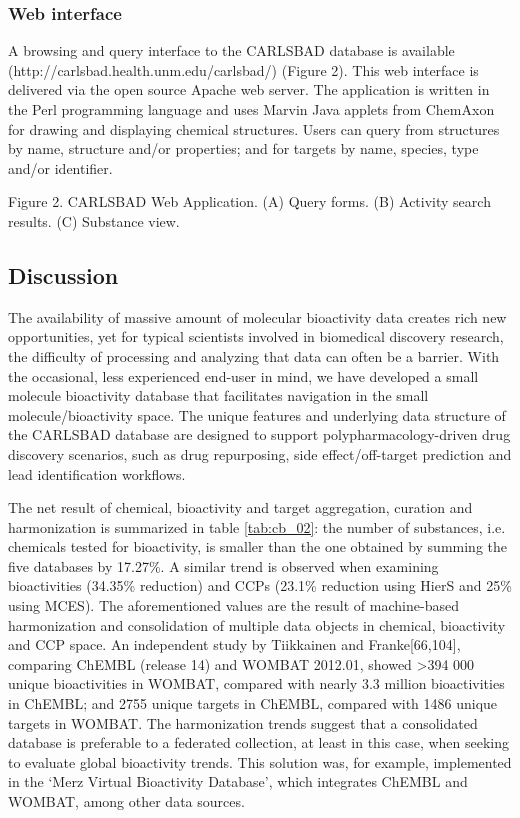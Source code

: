 \subsubsection{Web interface}

A browsing and query interface to the CARLSBAD database is available (http://carlsbad.health.unm.edu/carlsbad/) (Figure 2). This web interface is delivered via the open source Apache web server. The application is written in the Perl programming language and uses Marvin Java applets from ChemAxon for drawing and displaying chemical structures. Users can query from structures by name, structure and/or properties; and for targets by name, species, type and/or identifier.

Figure 2.
CARLSBAD Web Application. (A) Query forms. (B) Activity search results. (C) Substance view.

\subsection{Discussion}

The availability of massive amount of molecular bioactivity data creates rich new opportunities, yet for typical scientists involved in biomedical discovery research, the difficulty of processing and analyzing that data can often be a barrier. With the occasional, less experienced end-user in mind, we have developed a small molecule bioactivity database that facilitates navigation in the small molecule/bioactivity space. The unique features and underlying data structure of the CARLSBAD database are designed to support polypharmacology-driven drug discovery scenarios, such as drug repurposing, side effect/off-target prediction and lead identification workflows.

The net result of chemical, bioactivity and target aggregation, curation and harmonization is summarized in table \ref{tab:cb_02}: the number of substances, i.e. chemicals tested for bioactivity, is smaller than the one obtained by summing the five databases by 17.27\%. A similar trend is observed when examining bioactivities (34.35\% reduction) and CCPs (23.1\% reduction using HierS and 25\% using MCES). The aforementioned values are the result of machine-based harmonization and consolidation of multiple data objects in chemical, bioactivity and CCP space. An independent study by Tiikkainen and Franke[66,104], comparing ChEMBL (release 14) and WOMBAT 2012.01, showed >394 000 unique bioactivities in WOMBAT, compared with nearly 3.3 million bioactivities in ChEMBL; and 2755 unique targets in ChEMBL, compared with 1486 unique targets in WOMBAT. The harmonization trends suggest that a consolidated database is preferable to a federated collection, at least in this case, when seeking to evaluate global bioactivity trends. This solution was, for example, implemented in the ‘Merz Virtual Bioactivity Database’, which integrates ChEMBL and WOMBAT, among other data sources.

